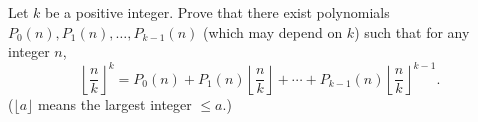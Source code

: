 Let $k$ be a positive integer. Prove that there exist polynomials
$P_0(n), P_1(n), \dots, P_{k-1}(n)$ (which may depend on $k$) such that
for any integer $n$,
\[
\left\lfloor \frac{n}{k} \right\rfloor^k = P_0(n) + P_1(n) \left\lfloor
\frac{n}{k} \right\rfloor + \cdots + P_{k-1}(n) \left\lfloor \frac{n}{k}
\right\rfloor^{k-1}.
\]
($\lfloor a \rfloor$ means the largest integer $\leq a$.)
